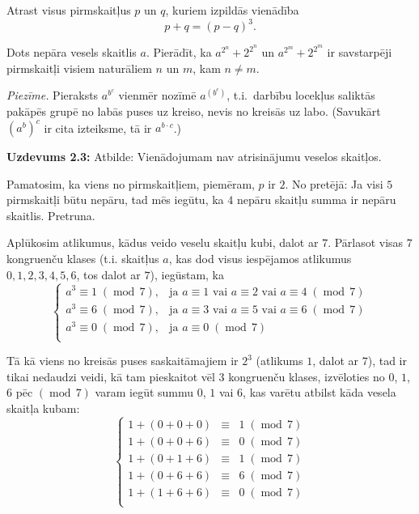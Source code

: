 \documentclass[a4paper,12pt]{article}
\begin{document}
\vspace{10pt}
\begin{problem}
Atrast visus pirmskaitļus $p$ un $q$, kuriem izpildās vienādība
$$p + q = (p - q)^3.$$
\end{problem}


\vspace{20pt}
\begin{problem}
Dots nepāra vesels skaitlis $a$. Pierādīt, ka ${\displaystyle a^{2^n} + 2^{2^n}}$
un ${\displaystyle a^{2^m} + 2^{2^m}}$ ir savstarpēji pirmskaitļi visiem naturāliem 
$n$ un $m$, kam $n \neq m$. 
\end{problem}


\vspace{5pt}
{\em Piezīme.} Pieraksts $a^{b^c}$ vienmēr nozīmē $a^{(b^c)}$, t.i.\ darbību locekļus saliktās pakāpēs
grupē no labās puses uz kreiso, nevis no kreisās uz labo.
(Savukārt $(a^b)^c$ ir cita izteiksme, tā ir $a^{b \cdot c}$.)

\newpage




{\bf Uzdevums 2.3:} Atbilde: Vienādojumam nav atrisinājumu veselos skaitļos.

Pamatosim, ka viens no pirmskaitļiem, piemēram, $p$ ir $2$.
No pretējā: Ja visi $5$ pirmskaitļi būtu nepāru, tad mēs iegūtu, ka $4$
nepāru skaitļu summa ir nepāru skaitlis. Pretruna.

Aplūkosim atlikumus, kādus veido veselu skaitļu kubi, dalot ar $7$.
Pārlasot visas $7$ kongruenču klases (t.i. skaitļus $a$, kas dod visus
iespējamos atlikumus $0,1,2,3,4,5,6$, tos dalot ar $7$), iegūstam, ka
\[
\left\{
\begin{array}{ll}
a^3 \equiv 1\;(\operatorname{mod}\,7), & \mbox{ja $a \equiv 1$ vai $a \equiv 2$ vai $a \equiv 4\;(\operatorname{mod}\,7)$}\\
a^3 \equiv 6\;(\operatorname{mod}\,7), & \mbox{ja $a \equiv 3$ vai $a \equiv 5$ vai $a \equiv 6\;(\operatorname{mod}\,7)$}\\
a^3 \equiv 0\;(\operatorname{mod}\,7), & \mbox{ja $a \equiv 0\;(\operatorname{mod}\,7)$}\\
\end{array}
\right.
\]

Tā kā viens no kreisās puses saskaitāmajiem ir $2^3$ (atlikums $1$, dalot ar $7$), tad
ir tikai nedaudzi veidi, kā tam pieskaitot vēl $3$ kongruenču klases,
izvēloties no $0$, $1$, $6$ pēc $(\operatorname{mod}\,7)$
varam iegūt summu $0$, $1$ vai $6$, kas varētu atbilst kāda vesela skaitļa kubam:
\[
\left\{
\begin{array}{rcl}
1 + (0 + 0 + 0) & \equiv & 1\;(\operatorname{mod}\,7)\\
1 + (0 + 0 + 6) & \equiv & 0\;(\operatorname{mod}\,7)\\
1 + (0 + 1 + 6) & \equiv & 1\;(\operatorname{mod}\,7)\\
1 + (0 + 6 + 6) & \equiv & 6\;(\operatorname{mod}\,7)\\
1 + (1 + 6 + 6) & \equiv & 0\;(\operatorname{mod}\,7)\\
\end{array}
\right.
\]
\end{document}
